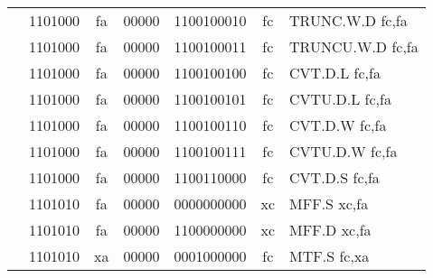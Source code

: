 \begin{table}[p]
\begin{small}
\begin{center}
\begin{tabular}{rcccccccccl}
&
\multicolumn{2}{|c|}{1101000} &
\multicolumn{1}{c|}{fa} &
\multicolumn{1}{c|}{00000} &
\multicolumn{4}{c|}{1100100010} &
\multicolumn{1}{c|}{fc} & TRUNC.W.D fc,fa \\
\cline{2-10}
  

&
\multicolumn{2}{|c|}{1101000} &
\multicolumn{1}{c|}{fa} &
\multicolumn{1}{c|}{00000} &
\multicolumn{4}{c|}{1100100011} &
\multicolumn{1}{c|}{fc} & TRUNCU.W.D fc,fa \\
\cline{2-10}
  

&
\multicolumn{2}{|c|}{1101000} &
\multicolumn{1}{c|}{fa} &
\multicolumn{1}{c|}{00000} &
\multicolumn{4}{c|}{1100100100} &
\multicolumn{1}{c|}{fc} & CVT.D.L fc,fa \\
\cline{2-10}
  

&
\multicolumn{2}{|c|}{1101000} &
\multicolumn{1}{c|}{fa} &
\multicolumn{1}{c|}{00000} &
\multicolumn{4}{c|}{1100100101} &
\multicolumn{1}{c|}{fc} & CVTU.D.L fc,fa \\
\cline{2-10}
  

&
\multicolumn{2}{|c|}{1101000} &
\multicolumn{1}{c|}{fa} &
\multicolumn{1}{c|}{00000} &
\multicolumn{4}{c|}{1100100110} &
\multicolumn{1}{c|}{fc} & CVT.D.W fc,fa \\
\cline{2-10}
  

&
\multicolumn{2}{|c|}{1101000} &
\multicolumn{1}{c|}{fa} &
\multicolumn{1}{c|}{00000} &
\multicolumn{4}{c|}{1100100111} &
\multicolumn{1}{c|}{fc} & CVTU.D.W fc,fa \\
\cline{2-10}
  

&
\multicolumn{2}{|c|}{1101000} &
\multicolumn{1}{c|}{fa} &
\multicolumn{1}{c|}{00000} &
\multicolumn{4}{c|}{1100110000} &
\multicolumn{1}{c|}{fc} & CVT.D.S fc,fa \\
\cline{2-10}
  

&
\multicolumn{2}{|c|}{1101010} &
\multicolumn{1}{c|}{fa} &
\multicolumn{1}{c|}{00000} &
\multicolumn{4}{c|}{0000000000} &
\multicolumn{1}{c|}{xc} & MFF.S xc,fa \\
\cline{2-10}
  

&
\multicolumn{2}{|c|}{1101010} &
\multicolumn{1}{c|}{fa} &
\multicolumn{1}{c|}{00000} &
\multicolumn{4}{c|}{1100000000} &
\multicolumn{1}{c|}{xc} & MFF.D xc,fa \\
\cline{2-10}
  

&
\multicolumn{2}{|c|}{1101010} &
\multicolumn{1}{c|}{xa} &
\multicolumn{1}{c|}{00000} &
\multicolumn{4}{c|}{0001000000} &
\multicolumn{1}{c|}{fc} & MTF.S fc,xa \\
\cline{2-10}
  


\end{tabular}
\end{center}
\end{small}
\end{table}
